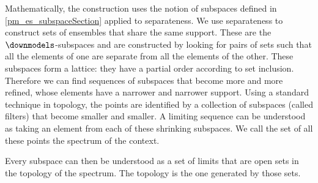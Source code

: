 Mathematically, the construction uses the notion of subspaces defined in \ref{pm_es_subspaceSection} applied to separateness. We use separateness to construct sets of ensembles that share the same support. These are the $\separate$-subspaces and are constructed by looking for pairs of sets such that all the elements of one are separate from all the elements of the other. These subspaces form a lattice: they have a partial order according to set inclusion. Therefore we can find sequences of subspaces that become more and more refined, whose elements have a narrower and narrower support. Using a standard technique in topology, the points are identified by a collection of subspaces (called filters) that become smaller and smaller. A limiting sequence can be understood as taking an element from each of these shrinking subspaces. We call the set of all these points the spectrum of the context.

Every subspace can then be understood as a set of limits that are open sets in the topology of the spectrum. The topology is the one generated by those sets.


